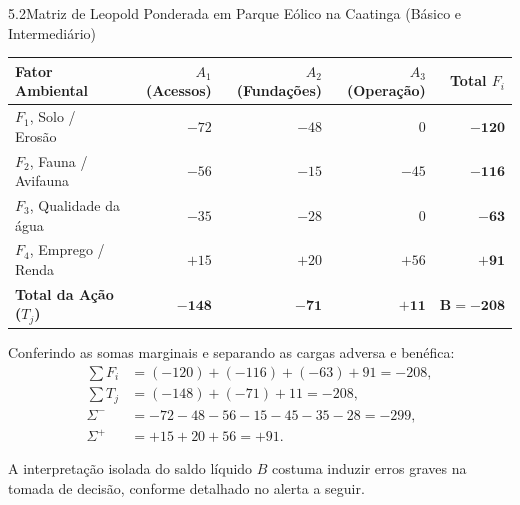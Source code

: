 \begin{boxExemplo}{5.2}{Matriz de Leopold Ponderada em Parque Eólico na Caatinga (Básico e Intermediário)}
{\begin{center}
    \begin{tabularx}{0.96\linewidth}{@{}X r r r r@{}}
      \toprule
      \textbf{Fator Ambiental} & \textbf{$A_1$ (Acessos)} & \textbf{$A_2$ (Fundações)} & \textbf{$A_3$ (Operação)} & \textbf{Total $F_i$} \\
      \midrule
      $F_1$, Solo / Erosão & $-72$ & $-48$ & $0$ & $\mathbf{-120}$ \\
      $F_2$, Fauna / Avifauna & $-56$ & $-15$ & $-45$ & $\mathbf{-116}$ \\
      $F_3$, Qualidade da água & $-35$ & $-28$ & $0$ & $\mathbf{-63}$ \\
      $F_4$, Emprego / Renda & $+15$ & $+20$ & $+56$ & $\mathbf{+91}$ \\
      \midrule
      \textbf{Total da Ação ($T_j$)} & $\mathbf{-148}$ & $\mathbf{-71}$ & $\mathbf{+11}$ & $\mathbf{B = -208}$ \\
      \bottomrule
    \end{tabularx}
    \end{center}
    Conferindo as somas marginais e separando as cargas adversa e benéfica:
    \begin{align*}
      \sum F_i &= (-120) + (-116) + (-63) + 91 = -208, \\
      \sum T_j &= (-148) + (-71) + 11 = -208, \\
      \Sigma^{-} &= -72 - 48 - 56 - 15 - 45 - 35 - 28 = -299, \\
      \Sigma^{+} &= +15 + 20 + 56 = +91.
    \end{align*}}
\end{boxExemplo}

A interpretação isolada do saldo líquido $B$ costuma induzir erros graves na tomada de decisão, conforme detalhado no alerta a seguir.

